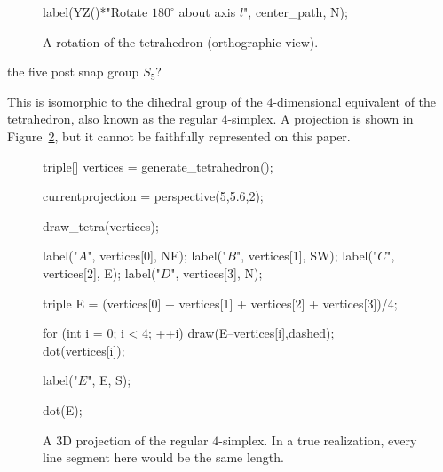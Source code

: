\documentclass[../gatm_answers.tex]{subfiles}
\begin{document}
\begin{figure}[h]
\begin{center}
\begin{minipage}[b]{\textwidth}
\begin{asy}[width=0.5\textwidth]
			label(YZ()*"Rotate $180^\circ$ about axis $l$", center_path, N);
			\end{asy}
		\end{minipage}
	\end{center}
	\vspace*{-2\baselineskip}
	\begin{center}
		\begin{minipage}[t]{\textwidth}
			\caption{A rotation of the tetrahedron (orthographic view).}
			\label{fig:tetra_element}
		\end{minipage}
	\end{center}
	\vspace*{-2\baselineskip}
\end{figure}

\begin{inner_problem}
\item the five post snap group $S_5$?
\end{inner_problem}

\noindent This is isomorphic to the dihedral group of the $4$-dimensional equivalent of the tetrahedron, also known as the regular $4$-simplex. A projection is shown in Figure~\ref{fig:four_simplex_attempt}, but it cannot be faithfully represented on this paper.

\begin{figure}[h]
	\begin{center}
		\begin{minipage}[b]{\textwidth}
			\centering
			\begin{asy}[width=0.3\textwidth]
			
			triple[] vertices = generate_tetrahedron();
			
			currentprojection = perspective(5,5.6,2);
			
			draw_tetra(vertices);
			
			
			label("$A$", vertices[0], NE);
			label("$B$", vertices[1], SW);
			label("$C$", vertices[2], E);
			label("$D$", vertices[3], N);
			
			triple E = (vertices[0] + vertices[1] + vertices[2] + vertices[3])/4;
			
			for (int i = 0; i < 4; ++i) {
				draw(E--vertices[i],dashed);
				dot(vertices[i]);
			}
			
			label("$E$", E, S);
			
			dot(E);
			
			\end{asy}
		\end{minipage}
	\end{center}
	\vspace*{-2\baselineskip}
	\begin{center}
		\begin{minipage}[t]{\textwidth}
			\caption{A 3D projection of the regular $4$-simplex. In a true realization, every line segment here would be the same length.}
			\label{fig:four_simplex_attempt}
		\end{minipage}
	\end{center}
	\vspace*{-2\baselineskip}
\end{figure}
\end{document}
